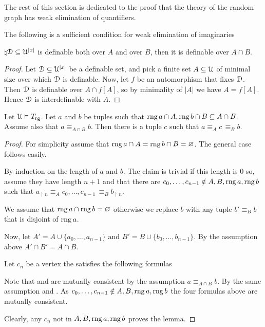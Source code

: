 \documentclass[creche.tex]{subfiles}
\begin{document}
The rest of this section is dedicated to the proof that the theory of the random graph has weak elimination of quantifiers.

\begin{lemma}\label{lem_suff_wei}
  The following is a sufficient condition for weak elimination of imaginaries

  $\natural$\qquad $\EuScript D\subseteq\EuScript U^{|x|}$ is definable both over $A$ and over $B$, then it is definable over $A\cap B$.
\end{lemma}

\begin{proof}
  Let $\EuScript D\subseteq\EuScript U^{|x|}$ be a definable set, and pick a finite set $A\subseteq\EuScript U$ of minimal size over which $\EuScript D$ is definable. 
  Now, let $f$ be an automorphism that fixes $\EuScript D$. Then $\EuScript D$ is definable over $A\cap f[A]$, so by minimality of $|A|$ we have $A= f[A]$. 
  Hence $\EuScript D$ is interdefinable with $A$.
\end{proof}

\begin{lemma}\label{lem_type_amalgamation}
  Let $\EuScript U\vDash T_{\rm rg}$.
  Let $a$ and $b$ be tuples such that $\mathop{\rm rng} a\cap A,\mathop{\rm rng} b\cap B\subseteq A\cap B$.
  Assume also that $a\equiv_{A\cap B}b$.
  Then there is a tuple $c$ such that $a\equiv_A c\,\equiv_B b$.
\end{lemma}

\begin{proof}
  For simplicity assume that $\mathop{\rm rng} a\cap A=\mathop{\rm rng} b\cap B=\varnothing$.
  The general case follows easily.

  By induction on the length of $a$ and $b$. 
  The claim is trivial if this length is $0$ so, assume they have length $n+1$ and that there are $c_0,\dots,c_{n-1}\notin A, B,\mathop{\rm rng} a,\mathop{\rm rng} b$ such that $a_{\restriction n}\equiv_A c_0,\dots,c_{n-1}\,\equiv_B b_{\restriction n}$.

  
  We assume that $\mathop{\rm rng} a\cap\mathop{\rm rng} b=\varnothing$ otherwise we replace $b$ with any tuple $b'\equiv_Bb$ that is disjoint of $\mathop{\rm rng} a$.

  Now, let $A'=A\cup\{a_0,\dots,a_{n-1}\}$ and $B'=B\cup\{b_0,\dots,b_{n-1}\}$.
  By the assumption above $A'\cap B'=A\cap B$.

  Let $c_n$ be a vertex the satisfies the following formulas





  Note that  and  are mutually consistent by the assumption $a\equiv_{A\cap B}b$.
  By the same assumption  and .
  As $c_0,\dots,c_{n-1}\notin A, B,\mathop{\rm rng} a,\mathop{\rm rng} b$ the four formulas above are mutually consistent.

  Clearly, any $c_n$ not in $A, B,\mathop{\rm rng} a,\mathop{\rm rng} b$ proves the lemma.
\end{proof}
\end{document}
